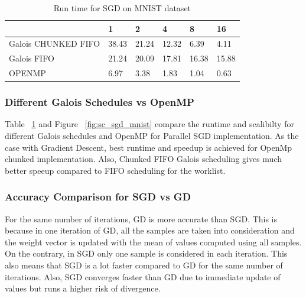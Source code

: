 \documentclass{sigplanconf}
\begin{document}
{\begin{table}[htbp]
\caption{Run time for SGD on MNIST dataset}
\begin{tabular}{|p{9em}|p{2em}|p{2em}|p{2em}|p{2em}|p{2em}|}
\hline
 & 1 & 2 & 4 & 8 & 16 \\ \hline
Galois CHUNKED FIFO & 38.43 & 21.24 & 12.32 & 6.39 & 4.11 \\ \hline
Galois FIFO & 21.24 & 20.09 & 17.81 & 16.38 & 15.88 \\ \hline
OPENMP & 6.97 & 3.38 & 1.83 & 1.04 & 0.63 \\ \hline
\end{tabular}
\label{tb:sgd_mnist}
\end{table}

	\subsubsection{Different Galois Schedules vs OpenMP}
	Table ~\ref{tb:sgd_mnist} and Figure ~\ref{fig:sc_sgd_mnist} compare the runtime and scalibilty for different Galois schedules and OpenMP for Parallel SGD
	implementation. As the case with Gradient Descent, best runtime and speedup is achieved for OpenMp chunked implementation.
	Also, Chunked FIFO Galois scheduling gives much better speeup compared to FIFO scheduling for the worklist.
	
	\subsubsection{Accuracy Comparison for SGD vs GD}
	For the same number of iterations, GD is more accurate than SGD. This is because in one iteration
	of GD, all the samples are taken into consideration and the weight vector is updated with the mean of values computed using all
	samples. On the contrary, in SGD only one sample is considered in each iteration. This also means that SGD is a lot faster compared
	to GD for the same number of iterations. Also, SGD converges faster than GD due to immediate update of values but runs a higher
	risk of divergence.

}
\end{document}
